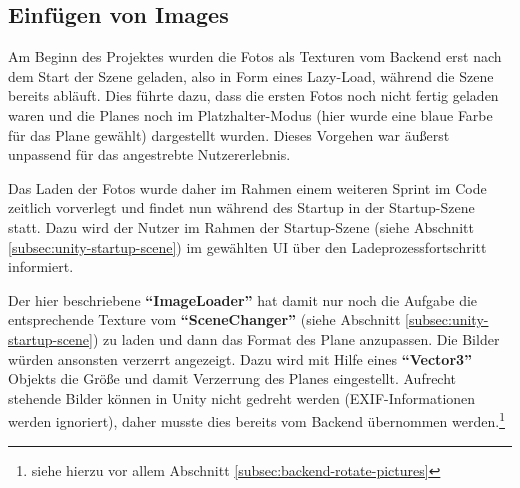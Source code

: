 \subsection{Einfügen von Images}
\label{subsec:unity-image-loader}

Am Beginn des Projektes wurden die Fotos als Texturen vom Backend erst nach dem Start der Szene geladen, also in Form eines Lazy-Load, während die Szene bereits abläuft. Dies führte dazu, dass die ersten Fotos noch nicht fertig geladen waren und die Planes noch im Platzhalter-Modus (hier wurde eine blaue Farbe für das Plane gewählt) dargestellt wurden. Dieses Vorgehen war äußerst unpassend für das angestrebte Nutzererlebnis. 

Das Laden der Fotos wurde daher im Rahmen einem weiteren Sprint im Code zeitlich vorverlegt und findet nun während des Startup in der Startup-Szene statt. Dazu wird der Nutzer im Rahmen der Startup-Szene (siehe Abschnitt \ref{subsec:unity-startup-scene}) im gewählten UI über den Ladeprozessfortschritt informiert.

Der hier beschriebene \textbf{``ImageLoader''} hat damit nur noch die Aufgabe die entsprechende Texture vom \textbf{``SceneChanger''} (siehe Abschnitt \ref{subsec:unity-startup-scene}) zu laden und dann das Format des Plane anzupassen. Die Bilder würden ansonsten verzerrt angezeigt. Dazu wird mit Hilfe eines \textbf{``Vector3''} Objekts die Größe und damit Verzerrung des Planes eingestellt. Aufrecht stehende Bilder können in Unity nicht gedreht werden (EXIF-Informationen werden ignoriert), daher musste dies bereits vom Backend übernommen werden.\footnote{siehe hierzu vor allem Abschnitt \ref{subsec:backend-rotate-pictures}} 


